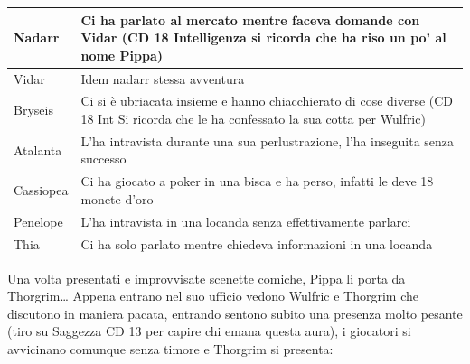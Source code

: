 \documentclass{article}
\begin{document}
    \begin{table}[h]
    
        \begin{tabular}{|m{2cm}|m{10cm}|}
            \hline
            Nadarr&  Ci ha parlato al mercato mentre faceva domande con Vidar
             (CD 18  Intelligenza si ricorda che ha riso un po’ al nome Pippa)\\
             \hline
             Vidar & Idem nadarr stessa avventura\\
               \hline
Bryseis & Ci si è ubriacata insieme e hanno chiacchierato di cose diverse (CD 18 Int Si ricorda che le ha confessato la sua cotta per Wulfric) \\
\hline
Atalanta & L’ha intravista durante una sua perlustrazione, l’ha inseguita senza successo \\
\hline
Cassiopea & Ci ha giocato a poker in una bisca e ha perso, infatti le deve 18 monete d’oro \\
\hline
Penelope  & L’ha intravista in una locanda senza effettivamente parlarci \\
\hline
Thia & Ci ha solo parlato mentre chiedeva informazioni in una locanda  \\
\hline

\end{tabular}  
    \end{table}
Una volta presentati e improvvisate scenette comiche, Pippa li porta da Thorgrim…
Appena entrano nel suo ufficio vedono Wulfric e Thorgrim che discutono in maniera pacata, entrando sentono subito una presenza molto pesante (tiro su Saggezza CD 13 per capire chi emana questa aura), i giocatori si avvicinano comunque senza timore e Thorgrim si presenta:
\end{document}
